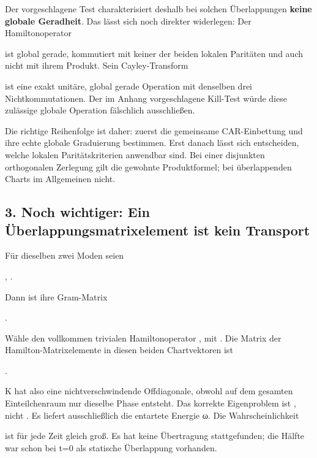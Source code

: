 Der vorgeschlagene Test  charakterisiert
deshalb bei solchen Überlappungen \textbf{keine globale Geradheit}. Das
lässt sich noch direkter widerlegen: Der Hamiltonoperator


ist global gerade, kommutiert mit keiner der beiden lokalen Paritäten
und auch nicht mit ihrem Produkt. Sein Cayley-Transform


ist eine exakt unitäre, global gerade Operation mit denselben drei
Nichtkommutationen. Der im Anhang vorgeschlagene Kill-Test würde diese
zulässige globale Operation fälschlich ausschließen.

Die richtige Reihenfolge ist daher: zuerst die gemeinsame CAR-Einbettung
und ihre echte globale Graduierung bestimmen. Erst danach lässt sich
entscheiden, welche lokalen Paritätskriterien anwendbar sind. Bei einer
disjunkten orthogonalen Zerlegung gilt die gewohnte Produktformel; bei
überlappenden Charts im Allgemeinen nicht.

\subsection{3. Noch wichtiger: Ein Überlappungsmatrixelement ist kein
Transport}\label{noch-wichtiger-ein-uxfcberlappungsmatrixelement-ist-kein-transport}

Für dieselben zwei Moden seien

, .

Dann ist ihre Gram-Matrix

.

Wähle den vollkommen trivialen Hamiltonoperator , mit
. Die Matrix der Hamilton-Matrixelemente in
diesen beiden Chartvektoren ist

.

K hat also eine nichtverschwindende Offdiagonale, obwohl auf dem
gesamten Einteilchenraum nur dieselbe Phase
 entsteht. Das korrekte Eigenproblem
ist , nicht . Es liefert
ausschließlich die entartete Energie ω. Die Wahrscheinlichkeit


ist für jede Zeit gleich groß. Es hat keine Übertragung stattgefunden;
die Hälfte war schon bei t=0 als statische Überlappung vorhanden.

